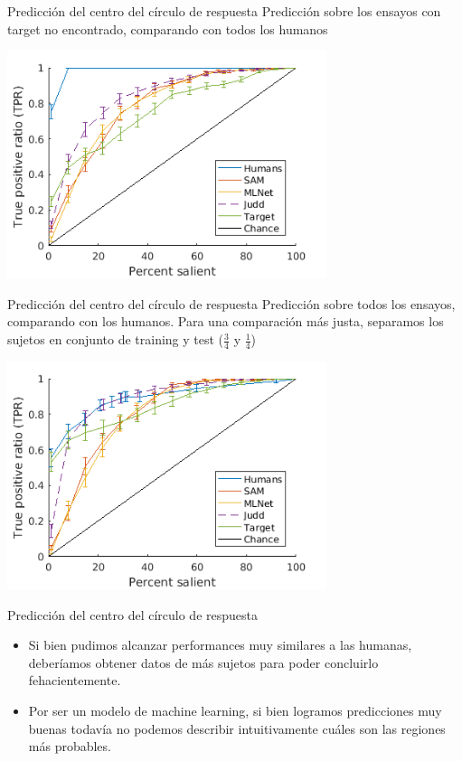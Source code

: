 \documentclass[compress]{beamer}
\begin{document}
\begin{frame}{Predicción del centro del círculo de respuesta}
{Predicción sobre los ensayos con target no encontrado, comparando con todos los humanos}

\begin{center}
\includegraphics[width=0.7\textwidth]{images/guess_notfound_1.png} 
\end{center}
\end{frame}

\begin{frame}{Predicción del centro del círculo de respuesta}
{Predicción sobre todos los ensayos, comparando con los humanos. Para una comparación más justa, separamos los sujetos en conjunto de training y test ($\frac{3}{4}$ y $\frac{1}{4}$)}

\begin{center}
\includegraphics[width=0.7\textwidth]{images/guess_all_test_2.png} 
\end{center}
\end{frame}

\begin{frame}{Predicción del centro del círculo de respuesta}
\begin{itemize}
\item Si bien pudimos alcanzar performances muy similares a las humanas, deberíamos obtener datos de más sujetos para poder concluirlo fehacientemente.
\item Por ser un modelo de machine learning, si bien logramos predicciones muy buenas todavía no podemos describir intuitivamente cuáles son las regiones más probables.
\end{itemize}
\end{frame}
\end{document}
